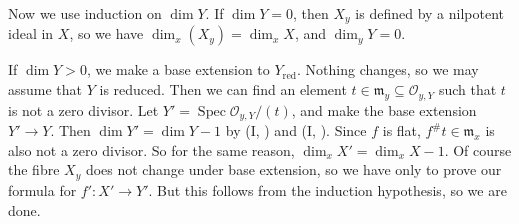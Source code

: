 {Now we use induction on $\dim Y$. If $\dim Y=0$, then $X_y$ is defined by a nilpotent ideal in $X$, so we have $\dim_x(X_y)=\dim_x X$, and $\dim_y Y=0$.

If $\dim Y>0$, we make a base extension to $Y_{\mathrm{red}}$. Nothing changes, so we may assume that $Y$ is reduced. Then we can find an element $t\in\mathfrak m_y\subseteq\mathcal O_{y,Y}$ such that $t$ is not a zero divisor. Let $Y'=\operatorname{Spec}\mathcal O_{y,Y}/(t)$, and make the base extension $Y'\to Y$. Then $\dim Y'=\dim Y-1$ by (I, ) and (I, ). Since $f$ is flat, $f^\#t\in\mathfrak m_x$ is also not a zero divisor. So for the same reason, $\dim_x X'=\dim_x X-1$. Of course the fibre $X_y$ does not change under base extension, so we have only to prove our formula for $f'\colon X'\to Y'$. But this follows from the induction hypothesis, so we are done.}
